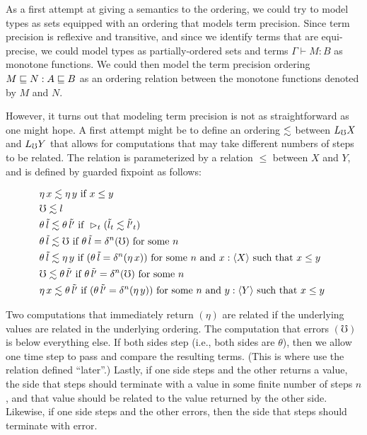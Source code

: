 As a first attempt at giving a semantics to the ordering, we could try to model types as
sets equipped with an ordering that models term precision. Since term precision is reflexive
and transitive, and since we identify terms that are equi-precise, we could model types
as partially-ordered sets and terms $\Gamma \vdash M : B$ as monotone functions.
We could then model the term precision ordering $M \sqsubseteq N : A \sqsubseteq B$ as an
ordering relation between the monotone functions denoted by $M$ and $N$.

However, it turns out that modeling term precision is not as straightforward as one might hope.
A first attempt might be to define an ordering $\lesssim$ between $L_\mho X$ and $L_\mho Y$
that allows for computations that may take different numbers of steps to be related.
The relation is parameterized by a relation $\le$ between $X$ and $Y$, and is defined
by guarded fixpoint as follows:

\begin{align*}
  &\eta\, x \semltbad \eta\, y \text{ if } 
    x \semlt y \\
%		
  &\mho \semltbad l \\
%
  &\theta\, \tilde{l} \semltbad \theta\, \tilde{l'} \text{ if } 
    \later_t (\tilde{l}_t \semltbad \tilde{l'}_t) \\
%	
  &\theta\, \tilde{l} \semltbad \mho \text{ if } 
    \theta\, \tilde{l} = \delta^n(\mho) \text { for some $n$ } \\
%	
  &\theta\, \tilde{l} \semltbad \eta\, y \text{ if }
    (\theta\, \tilde{l} = \delta^n(\eta\, x))
  \text { for some $n$ and $x : \ty{X}$ such that $x \le y$ } \\
%
  &\mho \semltbad \theta\, \tilde{l'} \text { if } 
    \theta\, \tilde{l'} = \delta^n(\mho) \text { for some $n$ } \\
%	
  &\eta\, x \semltbad \theta\, \tilde{l'} \text { if }
    (\theta\, \tilde{l'} = \delta^n (\eta\, y))
  \text { for some $n$ and $y : \ty{Y}$ such that $x \le y$ }
\end{align*}

Two computations that immediately return $(\eta)$ are related if the underlying
values are related in the underlying ordering. 
%
The computation that errors $(\mho)$ is below everything else.
%
If both sides step (i.e., both sides are $\theta$),
then we allow one time step to pass and compare the resulting terms.
(This is where use the relation defined ``later''.)
%
Lastly, if one side steps and the other returns a value, the side that steps should
terminate with a value in some finite number of steps $n$, and that value should
be related to the value returned by the other side.
Likewise, if one side steps and the other errors, then the side that steps
should terminate with error.

